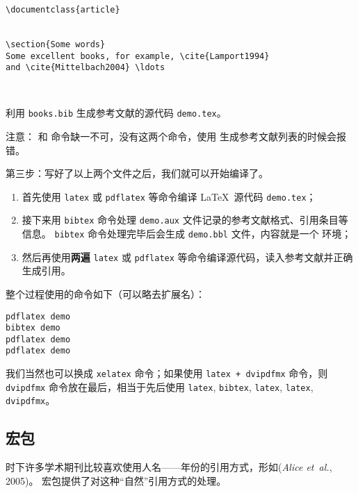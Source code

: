 \begin{sourcecode}[htp]
\begin{Verbatim}
\documentclass{article}


\section{Some words}
Some excellent books, for example, \cite{Lamport1994} 
and \cite{Mittelbach2004} \ldots



\end{Verbatim}
\caption{利用 \texttt{books.bib} 生成参考文献的源代码 \texttt{demo.tex}。}
\end{sourcecode}

注意： 和  命令缺一不可，没有这两个命令，使用  生成参考文献列表的时候会报错。

第三步：写好了以上两个文件之后，我们就可以开始编译了。
\begin{enumerate}
  \item 首先使用 \texttt{latex} 或 \texttt{pdflatex} 等命令编译 \LaTeX\ 源代码 \texttt{demo.tex}；
  \item 接下来用 \texttt{bibtex} 命令处理 \texttt{demo.aux} 文件记录的参考文献格式、引用条目等信息。
  \texttt{bibtex} 命令处理完毕后会生成 \texttt{demo.bbl} 文件，内容就是一个  环境；
  \item 然后再使用\textbf{两遍} \texttt{latex} 或 \texttt{pdflatex} 等命令编译源代码，读入参考文献并正确生成引用。
\end{enumerate}

整个过程使用的命令如下（可以略去扩展名）：
\begin{verbatim}
pdflatex demo
bibtex demo
pdflatex demo
pdflatex demo
\end{verbatim}

我们当然也可以换成 \texttt{xelatex} 命令；如果使用 \texttt{latex + dvipdfmx} 命令，则 \texttt{dvipdfmx} 命令放在最后，相当于先后使用
\texttt{latex}, \texttt{bibtex}, \texttt{latex}, \texttt{latex}, \texttt{dvipdfmx}。

\subsection{ 宏包}

时下许多学术期刊比较喜欢使用人名——年份的引用方式，形如(\emph{Alice et~al.}, 2005)。
 宏包提供了对这种“自然”引用方式的处理。

